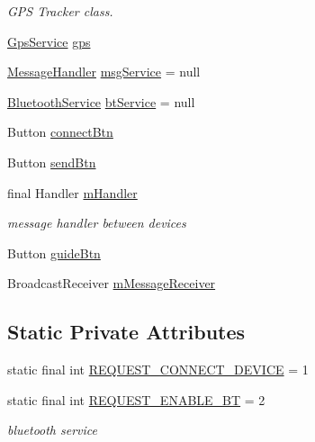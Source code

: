 \begin{DoxyCompactItemize}
\begin{DoxyCompactList}\small\item\em G\+PS Tracker class. \end{DoxyCompactList}\item 
\mbox{\hyperlink{classhi_1_1world_1_1hello_1_1myapplication_1_1_gps_service}{Gps\+Service}} \mbox{\hyperlink{classhi_1_1world_1_1hello_1_1myapplication_1_1_main_activity_ace2e1d57bc52244f417d114e616ae0bf}{gps}}
\item 
\mbox{\hyperlink{classhi_1_1world_1_1hello_1_1myapplication_1_1_message_handler}{Message\+Handler}} \mbox{\hyperlink{classhi_1_1world_1_1hello_1_1myapplication_1_1_main_activity_ac45fc29453f90ac4d9e5c3332a6f7714}{msg\+Service}} = null
\item 
\mbox{\hyperlink{classhi_1_1world_1_1hello_1_1myapplication_1_1_bluetooth_service}{Bluetooth\+Service}} \mbox{\hyperlink{classhi_1_1world_1_1hello_1_1myapplication_1_1_main_activity_a9f8fe7fafcc3f6705ac546ae6cbe8465}{bt\+Service}} = null
\item 
Button \mbox{\hyperlink{classhi_1_1world_1_1hello_1_1myapplication_1_1_main_activity_a8f2a7920b94c71f4792586b6b72ebfe6}{connect\+Btn}}
\item 
Button \mbox{\hyperlink{classhi_1_1world_1_1hello_1_1myapplication_1_1_main_activity_a2f1148e21c8899d0ef3352e275d235c3}{send\+Btn}}
\item 
final Handler \mbox{\hyperlink{classhi_1_1world_1_1hello_1_1myapplication_1_1_main_activity_a794d84f68f472a548b57f9a5c391e94a}{m\+Handler}}
\begin{DoxyCompactList}\small\item\em message handler between devices \end{DoxyCompactList}\item 
Button \mbox{\hyperlink{classhi_1_1world_1_1hello_1_1myapplication_1_1_main_activity_a9db38086399eb7fd30264210a74bfc0e}{guide\+Btn}}
\item 
Broadcast\+Receiver \mbox{\hyperlink{classhi_1_1world_1_1hello_1_1myapplication_1_1_main_activity_ab2a9f05b528fc54f76d8e68a872f4281}{m\+Message\+Receiver}}
\end{DoxyCompactItemize}
\subsection*{Static Private Attributes}
\begin{DoxyCompactItemize}
\item 
static final int \mbox{\hyperlink{classhi_1_1world_1_1hello_1_1myapplication_1_1_main_activity_ac26f5e205ba66bd6c2fdfb2ca18d0da6}{R\+E\+Q\+U\+E\+S\+T\+\_\+\+C\+O\+N\+N\+E\+C\+T\+\_\+\+D\+E\+V\+I\+CE}} = 1
\item 
static final int \mbox{\hyperlink{classhi_1_1world_1_1hello_1_1myapplication_1_1_main_activity_a5a4689f23b7e2188b9b42d16ef1c5220}{R\+E\+Q\+U\+E\+S\+T\+\_\+\+E\+N\+A\+B\+L\+E\+\_\+\+BT}} = 2
\begin{DoxyCompactList}\small\item\em bluetooth service \end{DoxyCompactList}\end{DoxyCompactItemize}


